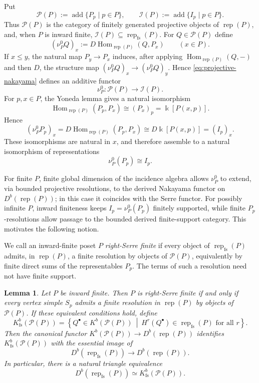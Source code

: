 \documentclass[12pt,reqno]{amsart}
\newtheorem{lemma}[theorem]{Lemma}
\theoremstyle{definition}
\theoremstyle{remark}
\newcommand{\Rep}{\operatorname{rep}}
\newcommand{\Hom}{\operatorname{Hom}}
\begin{document}
Put
\[
\mathcal P(P):=\operatorname{add}\{P_p\mid p\in P\},
\qquad
\mathcal I(P):=\operatorname{add}\{I_p\mid p\in P\}.
\]
Thus $\mathcal P(P)$ is the category of finitely generated projective objects
of $\Rep(P)$, and, when $P$ is inward finite,
$\mathcal I(P)\subseteq\Rep_{\mathrm{fs}}(P)$.  For
$Q\in\mathcal P(P)$ define
\begin{equation}\label{eq:projective-nakayama}
(\nu_P^0 Q)_x
:=
D\Hom_{\Rep(P)}(Q,P_x)
\qquad(x\in P).
\end{equation}
If $x\le y$, the natural map $P_y\to P_x$ induces, after applying
$\Hom_{\Rep(P)}(Q,-)$ and then $D$, the structure map
$(\nu_P^0Q)_x\to(\nu_P^0Q)_y$.  Hence \eqref{eq:projective-nakayama} defines
an additive functor
\[
\nu_P^0:\mathcal P(P)\longrightarrow\mathcal I(P).
\]
For $p,x\in P$, the Yoneda lemma gives a natural isomorphism
\[
\Hom_{\Rep(P)}(P_p,P_x)
\cong
(P_x)_p
=
\Bbbk[P(x,p)].
\]
Hence
\[
(\nu_P^0P_p)_x
=
D\Hom_{\Rep(P)}(P_p,P_x)
\cong
D\Bbbk[P(x,p)]
=
(I_p)_x.
\]
These isomorphisms are natural in $x$, and therefore assemble to a natural
isomorphism of representations
\[
\nu_P^0(P_p)\cong I_p.
\]

For finite $P$, finite global dimension of the incidence algebra allows
$\nu_P^0$ to extend, via bounded projective resolutions, to the derived
Nakayama functor on $D^b(\Rep(P))$; in this case it coincides with the Serre
functor.  For possibly infinite $P$, inward finiteness keeps
$I_p=\nu_P^0(P_p)$ finitely supported,
while finite $P_p$-resolutions allow passage to the bounded derived
finite-support category.  This motivates the following notion.

We call an inward-finite poset $P$ \emph{right-Serre finite} if every object
of $\Rep_{\mathrm{fs}}(P)$ admits, in $\Rep(P)$, a finite resolution by
objects of $\mathcal P(P)$, equivalently by finite direct sums of the
representables $P_p$.  The terms of such a resolution need not have finite
support.

\begin{lemma}
\label{lem:right-serre-model}
Let $P$ be inward finite.  Then $P$ is right-Serre finite if and only if every
vertex simple $S_p$ admits a finite resolution in $\Rep(P)$ by objects of
$\mathcal P(P)$.  If these equivalent conditions hold, define
\[
K^b_{\mathrm{fs}}(\mathcal P(P))
=
\left\{
Q^\bullet\in K^b(\mathcal P(P))\ \middle|\
H^r(Q^\bullet)\in\Rep_{\mathrm{fs}}(P)\text{ for all }r
\right\}.
\]
Then the canonical functor
$K^b(\mathcal P(P))\to D^b(\Rep(P))$ identifies
$K^b_{\mathrm{fs}}(\mathcal P(P))$ with the essential image of
\[
D^b(\Rep_{\mathrm{fs}}(P))\longrightarrow D^b(\Rep(P)).
\]
In particular, there is a natural triangle equivalence
\begin{equation}\label{eq:bounded-projective-model}
D^b(\Rep_{\mathrm{fs}}(P))
\simeq
K^b_{\mathrm{fs}}(\mathcal P(P)).
\end{equation}
\end{lemma}
\end{document}
